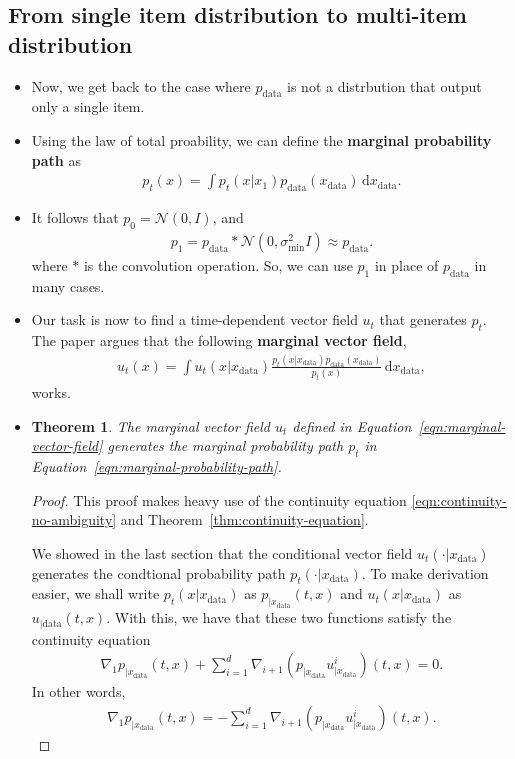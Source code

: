 \documentclass[10pt]{article}
\newtheorem{theorem}[lemma]{Theorem}
\newcommand{\dee}{\mathrm{d}}
\newcommand{\mrm}[1]{\mathrm{#1}}
\newcommand{\mcal}[1]{\mathcal{#1}}
\newcommand{\data}{\mathrm{data}}
\begin{document}
\subsection{From single item distribution to multi-item distribution}

\begin{itemize}
  \item Now, we get back to the case where $p_{\data}$ is not a distrbution that output only a single item.
  
  \item Using the law of total proability, we can define the {\bf marginal probability path} as
  \begin{align}
    p_t(x) = \int p_t(x|x_1) p_{\mrm{data}}(x_{\data})\, \dee x_{\data}. \label{eqn:marginal-probability-path}
  \end{align}
  
  \item It follows that $p_0 = \mcal{N}(0,I)$, and 
  \begin{align*}
    p_1 = p_{\data} * \mcal{N}(0,\sigma_{\min}^2I)  \approx p_{\mrm{data}}.
  \end{align*}
  where $*$ is the convolution operation. So, we can use $p_1$ in place of $p_{\data}$ in many cases.

  \item Our task is now to find a time-dependent vector field $u_t$ that generates $p_t$. The paper argues that the following {\bf marginal vector field},
  \begin{align}
    u_t(x) = \int u_t(x|x_{\data}) \frac{p_t(x|x_{\data}) p_{\mrm{data}}(x_{\data})}{p_t(x)}\, \dee x_{\data}, \label{eqn:marginal-vector-field}
  \end{align}
  works.  

  \item \begin{theorem}
    The marginal vector field $u_t$ defined in Equation~\eqref{eqn:marginal-vector-field} generates the marginal probability path $p_t$ in Equation~\eqref{eqn:marginal-probability-path}.
  \end{theorem}
  \begin{proof}
    This proof makes heavy use of the continuity equation \eqref{eqn:continuity-no-ambiguity} and Theorem~\ref{thm:continuity-equation}.

    We showed in the last section that the conditional vector field $u_t(\cdot|x_{\data})$ generates the condtional probability path $p_t(\cdot|x_{\data})$. To make derivation easier, we shall write $p_t(x|x_{\data})$ as $p_{|x_{\data}}(t,x)$ and $u_t(x|x_{\data})$ as $u_{|\data}(t,x)$. With this, we have that these two functions satisfy the continuity equation
    \begin{align*}
      \nabla_1 p_{|x_{\data}}(t,x) + \sum_{i=1}^d \nabla_{i+1} (p_{|x_{\data}}u^i_{|x_{\data}})(t,x) = 0.
    \end{align*}
    In other words,
    \begin{align*}
      \nabla_1 p_{|x_{\data}}(t,x) = -\sum_{i=1}^d \nabla_{i+1} (p_{|x_{\data}}u^i_{|x_{\data}})(t,x).
    \end{align*}


\end{proof}
\end{itemize}
\end{document}
